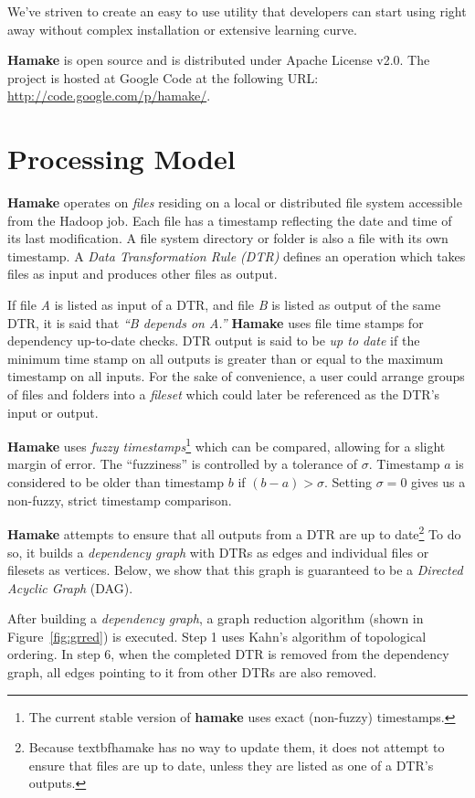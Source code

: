 \documentclass[10pt,conference,letterpaper]{IEEEtran}
\begin{document}
We've striven to create an easy to use utility that developers can
start using right away without complex installation or extensive
learning curve. 

\textbf{Hamake} is open source and is distributed under Apache
License v2.0. The project is hosted at Google Code at the following
URL: \url{http://code.google.com/p/hamake/}.

\section{Processing Model}

\textbf{Hamake} operates on \textit{files} residing on a local or
distributed file system accessible from the Hadoop job. Each file has a timestamp reflecting the date and time of its
last modification. A file system directory or folder is also a file
with its own timestamp. A \textit{Data Transformation Rule (DTR)}
defines an operation which takes files as input and produces other
files as output.

If file \textit{A} is listed as input of a DTR, and file \textit{B}
is listed as output of the same DTR, it is said that \textit{``B depends
  on A.''} \textbf{Hamake} uses file time stamps for dependency
up-to-date checks. DTR output is said to be \textit{up to date} if the minimum time stamp on all outputs is greater than or equal to the maximum timestamp on all inputs. For the sake of convenience, a user could arrange groups of files and folders into a \emph{fileset} which could later be referenced as the DTR's input or output.

\textbf{Hamake} uses \textit{fuzzy timestamps}\footnote{The current stable
  version of \textbf{hamake} uses exact (non-fuzzy) timestamps.}
which can be compared, allowing for a slight margin of error. The
``fuzziness'' is controlled by a tolerance of $\sigma$. Timestamp $a$ is considered to be older than timestamp $b$ if $(b-a)>\sigma$. Setting $\sigma=0$ gives us a non-fuzzy, strict timestamp comparison.

\textbf{Hamake} attempts to ensure that all outputs from a DTR are up to
date\footnote{Because textbf{hamake} has no way to update them, it does not attempt to ensure that files are up to date, unless they are listed as one of a DTR's outputs.} To do so, it builds a \textit{dependency graph} with DTRs as edges and individual files or filesets as vertices. Below, we show that this graph is guaranteed to be a \textit{Directed Acyclic Graph} (DAG).

After building a \textit{dependency graph}, a graph reduction algorithm (shown in Figure~\ref{fig:grred}) is executed. Step 1 uses Kahn's algorithm\cite{kahn1962topological} of topological ordering. In step 6, when the completed DTR is removed from the dependency graph, all edges pointing to it from other DTRs are also removed.
\end{document}

